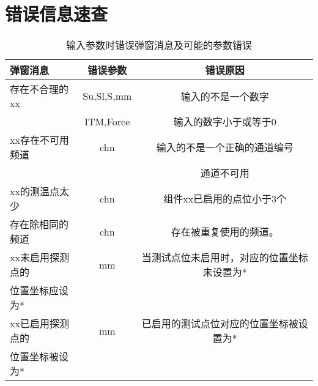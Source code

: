 \chapter{错误信息速查\label{app:errorInfo}}


\begin{table}[htbp]
    \centering
    \caption{ 输入参数时错误弹窗消息及可能的参数错误 \label{tab:errorInfoNormalUserA}}
    \begin{tabular}{@{}lcc@{}}
        \toprule
        弹窗消息         & 错误参数   & 错误原因                                    \\ \midrule
        存在不合理的xx   & Su,Sl,S,mm & 输入的不是一个数字                          \\
                         & ITM,Force  & 输入的数字小于或等于0                       \\
        xx存在不可用频道 & chn        & 输入的不是一个正确的通道编号                \\
                         &            & 通道不可用                                  \\
        xx的测温点太少   & chn        & 组件xx已启用的点位小于3个                   \\
        存在除相同的频道 & chn        & 存在被重复使用的频道。                      \\
        xx未启用探测点的 & mm         & 当测试点位未启用时，对应的位置坐标未设置为* \\
        位置坐标应设为*  &            &                                             \\
        xx已启用探测点的 & mm         & 已启用的测试点位对应的位置坐标被设置为*     \\
        位置坐标被设为*  &            &                                             \\
        \bottomrule
    \end{tabular}
\end{table}
